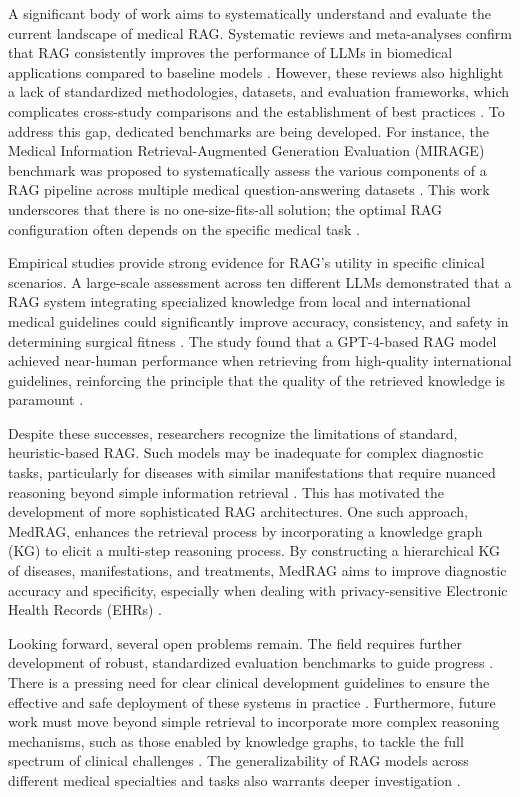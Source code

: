 \documentclass[11pt]{article}
\begin{document}
A significant body of work aims to systematically understand and evaluate the current landscape of medical RAG. Systematic reviews and meta-analyses confirm that RAG consistently improves the performance of LLMs in biomedical applications compared to baseline models \cite{ref10}. However, these reviews also highlight a lack of standardized methodologies, datasets, and evaluation frameworks, which complicates cross-study comparisons and the establishment of best practices \cite{ref11}. To address this gap, dedicated benchmarks are being developed. For instance, the Medical Information Retrieval-Augmented Generation Evaluation (MIRAGE) benchmark was proposed to systematically assess the various components of a RAG pipeline across multiple medical question-answering datasets \cite{ref12}. This work underscores that there is no one-size-fits-all solution; the optimal RAG configuration often depends on the specific medical task \cite{ref12}.

Empirical studies provide strong evidence for RAG's utility in specific clinical scenarios. A large-scale assessment across ten different LLMs demonstrated that a RAG system integrating specialized knowledge from local and international medical guidelines could significantly improve accuracy, consistency, and safety in determining surgical fitness \cite{ref13}. The study found that a GPT-4-based RAG model achieved near-human performance when retrieving from high-quality international guidelines, reinforcing the principle that the quality of the retrieved knowledge is paramount \cite{ref13}.

Despite these successes, researchers recognize the limitations of standard, heuristic-based RAG. Such models may be inadequate for complex diagnostic tasks, particularly for diseases with similar manifestations that require nuanced reasoning beyond simple information retrieval \cite{ref14}. This has motivated the development of more sophisticated RAG architectures. One such approach, MedRAG, enhances the retrieval process by incorporating a knowledge graph (KG) to elicit a multi-step reasoning process. By constructing a hierarchical KG of diseases, manifestations, and treatments, MedRAG aims to improve diagnostic accuracy and specificity, especially when dealing with privacy-sensitive Electronic Health Records (EHRs) \cite{ref14}.

Looking forward, several open problems remain. The field requires further development of robust, standardized evaluation benchmarks to guide progress \cite{ref12}. There is a pressing need for clear clinical development guidelines to ensure the effective and safe deployment of these systems in practice \cite{ref10}. Furthermore, future work must move beyond simple retrieval to incorporate more complex reasoning mechanisms, such as those enabled by knowledge graphs, to tackle the full spectrum of clinical challenges \cite{ref14}. The generalizability of RAG models across different medical specialties and tasks also warrants deeper investigation \cite{ref13}.
\end{document}
